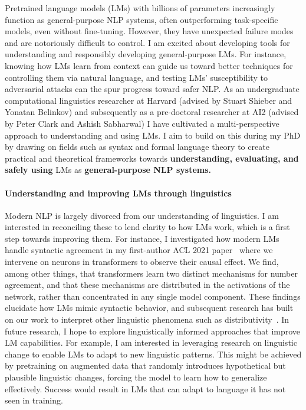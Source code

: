 \documentclass[11pt]{article}
\begin{document}
Pretrained language models (LMs) with billions of parameters 
increasingly function as general-purpose NLP systems, 
often outperforming task-specific models,
even without fine-tuning.
However, they have unexpected failure modes 
and are notoriously difficult to control.
I am excited about developing tools for understanding 
and responsibly developing general-purpose LMs.
For instance, knowing how LMs learn from context
can guide us toward better techniques 
for controlling them via natural language,
and testing LMs' susceptibility to adversarial attacks
can the spur progress toward safer NLP.
As an undergraduate computational linguistics researcher at Harvard 
(advised by Stuart Shieber and Yonatan Belinkov)
and subsequently as a pre-doctoral researcher at AI2 
(advised by Peter Clark and Ashish Sabharwal)
I have cultivated a multi-perspective approach to understanding and using LMs.
I aim to build on this during my PhD
by drawing on fields such as syntax and formal language theory 
to create practical and theoretical frameworks  
towards \textbf{understanding, evaluating, and safely using} LMs 
as \textbf{general-purpose NLP systems.}

\paragraph{Understanding and improving LMs through linguistics}

Modern NLP is largely divorced 
from our understanding of linguistics.
I am interested in reconciling these 
to lend clarity to how LMs work, 
which is a first step towards improving them.
For instance, I investigated how modern LMs handle syntactic agreement
in my first-author ACL 2021 paper~\cite{finlayson-etal-2021-causal}
where we intervene on neurons in transformers 
to observe their causal effect.
We find, among other things, that transformers learn 
two distinct mechanisms for number agreement,
and that these mechanisms are distributed 
in the activations of the network, 
rather than concentrated in any single model component.
These findings elucidate
how LMs mimic syntactic behavior,
and subsequent research has built on our work 
to interpret other linguistic phenomena 
such as distributivity~\cite{Ban2022TestingPL}.
In future research, I hope to explore 
linguistically informed approaches
that improve LM capabilities. 
For example, I am interested in leveraging 
research on linguistic change
to enable LMs to adapt to new linguistic patterns.
This might be achieved 
by pretraining on augmented data
that randomly introduces hypothetical but plausible linguistic changes,
forcing the model to learn how to generalize effectively.
Success would result in LMs that 
can adapt to language it has not seen in training.
\end{document}

